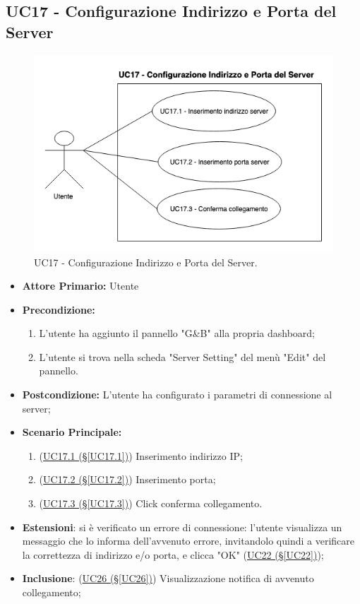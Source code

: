 \subsection{UC17 - Configurazione Indirizzo e Porta del Server}\label{UC17}
\begin{figure}[H]
	\centering
	\includegraphics[scale=0.65]{./images/UC17.png}
	\caption{UC17 - Configurazione Indirizzo e Porta del Server.}
\end{figure}
\begin{itemize}
	\item \textbf{Attore Primario:}  Utente
	\item \textbf{Precondizione:}
		\begin{enumerate}
			\item L'utente ha aggiunto il pannello "G\&B" alla propria dashboard;
			\item L'utente si trova nella scheda "Server Setting" del menù "Edit" del pannello.
		\end{enumerate}
	\item \textbf{Postcondizione:} L'utente ha configurato i parametri di connessione al server;
	\item \textbf{Scenario Principale:}
	\begin{enumerate}
		\item (\hyperref[UC17.1]{UC17.1 (§\ref*{UC17.1})}) Inserimento indirizzo IP;
		\item (\hyperref[UC17.2]{UC17.2 (§\ref*{UC17.2})}) Inserimento porta;
		\item (\hyperref[UC17.3]{UC17.3 (§\ref*{UC17.3})}) Click conferma collegamento.
	\end{enumerate}
	\item \textbf{Estensioni}: si è verificato un errore di connessione: l'utente visualizza un messaggio che lo informa dell'avvenuto errore, invitandolo quindi a verificare la correttezza di indirizzo e/o porta, e clicca "OK" (\hyperref[UC22]{UC22 (§\ref*{UC22})});
	\item  \textbf{Inclusione}: (\hyperref[UC26]{UC26 (§\ref*{UC26})}) Visualizzazione notifica di avvenuto collegamento;
\end{itemize}

